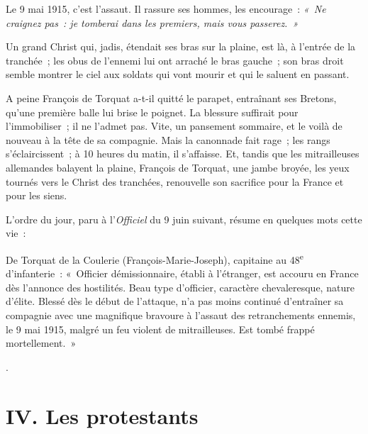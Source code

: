 \documentclass[french,twoside]{book} %
\newcommand\chapteropen{} %
\newcommand\chapterclose{} %
\begin{document}
{ Le 9 mai 1915, c’est l’assaut. Il rassure ses hommes, les encourage : \emph{« Ne craignez pas : je tomberai dans les premiers, mais vous passerez. »}‌\par
 Un grand Christ qui, jadis, étendait ses bras sur la plaine, est là, à l’entrée de la tranchée ; les obus de l’ennemi lui ont arraché le bras gauche ; son bras droit semble montrer le ciel aux soldats qui vont mourir et qui le saluent en passant.‌\par
 A peine François de Torquat a-t-il quitté le parapet, entraînant ses Bretons, qu’une première balle lui brise le poignet. La blessure suffirait pour l’immobiliser ; il ne l’admet pas. Vite, un pansement sommaire, et le voilà de nouveau à la tête de sa compagnie. Mais la canonnade fait rage ; les rangs s’éclaircissent ; à 10 heures du matin, il s’affaisse. Et, tandis que les mitrailleuses allemandes balayent la plaine, François de Torquat, une jambe broyée, les yeux tournés vers le Christ des tranchées, renouvelle son sacrifice pour la France et pour les siens.‌\par
 L’ordre du jour, paru à l’{\itshape Officiel} du 9 juin suivant, résume en quelques mots cette vie :‌\par
  \noindent De Torquat de la Coulerie (François-Marie-Joseph), capitaine au 48\textsuperscript{e} d’infanterie : « Officier démissionnaire, établi à l’étranger, est accouru en France dès l’annonce des hostilités. Beau type d’officier, caractère chevaleresque, nature d’élite. Blessé dès le début de l’attaque, n’a pas moins continué d’entraîner sa compagnie avec une magnifique bravoure à l’assaut des retranchements ennemis, le 9 mai 1915, malgré un feu violent de mitrailleuses. Est tombé frappé mortellement. »
 }.‌
\chapterclose


\chapteropen
\chapter[IV. Les protestants‌]{IV. Les protestants‌}\renewcommand{\leftmark}{IV. Les protestants‌}
\end{document}
